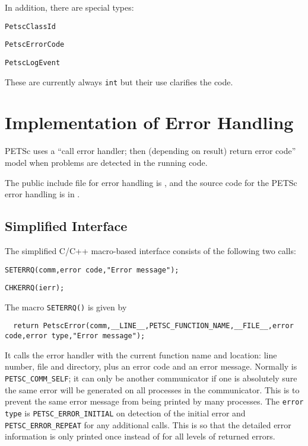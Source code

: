 In addition, there are special types:
\begin{tightitemize}
  \item \lstinline{PetscClassId}
  \item \lstinline{PetscErrorCode}
  \item \lstinline{PetscLogEvent}
\end{tightitemize}
These are currently always \lstinline{int} but their use clarifies the code.

\section{Implementation of Error Handling}

PETSc  uses a ``call error handler; then (depending on result) return
error code'' model when problems are detected in the running code.

The public include file for error handling is
 \href{http://www.mcs.anl.gov/petsc/petsc-master/include/petscerror.h.html}{}, 
 and the source code for the PETSc error handling is in .

\subsection{Simplified Interface}

The simplified C/C++ macro-based interface consists of the following two calls:
\begin{tightitemize}
  \item \lstinline{SETERRQ(comm,error code,"Error message");}
  \item \lstinline{CHKERRQ(ierr);}
\end{tightitemize}

The macro \lstinline{SETERRQ()} is given by
\begin{lstlisting}
  return PetscError(comm,__LINE__,PETSC_FUNCTION_NAME,__FILE__,error code,error type,"Error message");
\end{lstlisting}
It calls the error handler with the current function name and location: line number,
file and directory, plus an error code and an error message. 
Normally  is \lstinline{PETSC_COMM_SELF}; it can only be another communicator if
one is absolutely sure the same error will be generated on all processes in the communicator. 
This is to prevent the same error message from being printed by many processes. 
The \lstinline{error type} is \lstinline{PETSC_ERROR_INITIAL} on detection of the initial error and \lstinline{PETSC_ERROR_REPEAT} for any additional calls. 
This is so that the detailed error information is only printed once instead of for all levels of returned errors.

